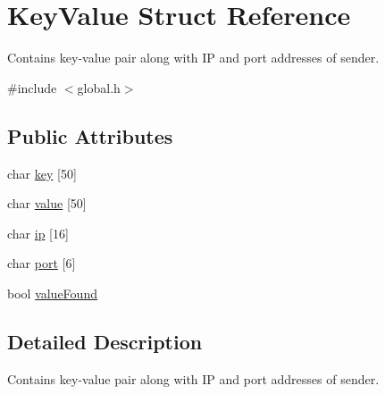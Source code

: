 \hypertarget{structKeyValue}{\section{Key\-Value Struct Reference}
\label{structKeyValue}
}


Contains key-\/value pair along with I\-P and port addresses of sender.  




{\ttfamily \#include $<$global.\-h$>$}

\subsection*{Public Attributes}
\begin{DoxyCompactItemize}
\item 
char \hyperlink{structKeyValue_a471911f5705e5260474fb8c8fb654d85}{key} \mbox{[}50\mbox{]}
\item 
char \hyperlink{structKeyValue_aecdacf280bd6aaba9bde2ab8be9bc8d6}{value} \mbox{[}50\mbox{]}
\item 
char \hyperlink{structKeyValue_a925635eab00a78fd446a3c55c309b7f3}{ip} \mbox{[}16\mbox{]}
\item 
char \hyperlink{structKeyValue_a888b790a99542bbeaa2533adb59bf1ae}{port} \mbox{[}6\mbox{]}
\item 
bool \hyperlink{structKeyValue_afbdc219b834bb70070e683b96e80a7d4}{value\-Found}
\end{DoxyCompactItemize}


\subsection{Detailed Description}
Contains key-\/value pair along with I\-P and port addresses of sender. 

